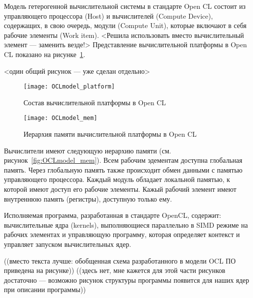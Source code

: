 Модель гетерогенной вычислительной системы в стандарте Open CL 
состоит из управляющего процессора (Host)
и вычислителей (Compute Device),
содержащих, в свою очередь, 
модули (Compute Unit),
которые включают в себя %
рабочие элементы (Work item).
<Решила использовать вместо вычислительный элемент --- заменить везде!>
Представление вычислительной платформы в Open CL
показано на рисунке~\ref{fig:OCL_platform}.

<один общий рисунок --- уже сделан отдельно>
\begin{figure}[h!]
  \centering
  \texttt{[image: OCLmodel\_platform]} 
  \caption{Состав вычислительной платформы в Open CL}
  \label{fig:OCL_platform}
\end{figure}
\FloatBarrier

\begin{figure}[h!]
  \centering
  \texttt{[image: OCLmodel\_mem]} 
  \caption{Иерархия памяти вычислительной платформы в Open CL}
  \label{fig:OCL_wg}
\end{figure}
\FloatBarrier




Вычислители
имеют следующую иерархию памяти 
(см. рисунок~\ref{fig:OCLmodel_mem}).
Всем рабочим эдементам доступна глобальная память. 
Через глобальную память также происходит обмен данными с памятью управляющего процессора. 
Каждый модуль 
обладает локальной памятью, к которой имеют доступ
его рабочие элементы.
Кажый рабочий элемент имеют внутреннюю  память (регистры), доступную только ему.

Исполняемая программа, разработанная в стандарте OpenCL,
содержит:  
вычислительные ядра (kernels), выполняющиеся
параллельно 
в SIMD режиме 
на рабочих элементах  %
и управляющую программу, которая
определяет контекст и 
управляет запуском вычислительных ядер.


((вместо текста лучше: обобщенная схема разработанного в модели OCL ПО приведена на рисунке))
((здесь нет, мне кажется для этой части рисунков достаточно --- возможно рисунок структуры программы
появится для наших ядер при описании программы))


